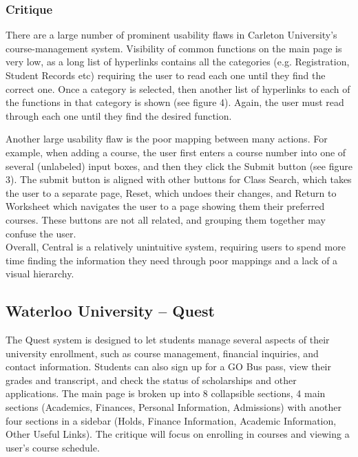 \documentclass[10pt]{article}
\newenvironment{InlineColumnFigure}
{\par\medskip\noindent\minipage{\linewidth}}
{\endminipage\par\medskip}
\newcommand{\Caption}[1]
{\vspace{-4mm}\fontsize{9}{9}\textbf{Figure \refstepcounter{figCounter} 
\arabic{figCounter}: #1}}
\newcounter{figCounter}
\begin{document}
\begin{multicols}{2}
\subsubsection*{Critique}
There are a large number of prominent usability flaws in Carleton University's 
course-management system. Visibility of common functions on the main 
page is very low, as a long list of hyperlinks contains all the categories (e.g. 
Registration, Student Records etc) requiring the user to read each one until 
they find the correct one. Once a category is selected, then another list of 
hyperlinks to each of the functions in that category is shown (see figure 4). 
Again, the user must read through each one until they find the desired function.



Another large usability flaw is the poor mapping between many actions. For 
example, when adding a course, the user first enters a course number into one of 
several (unlabeled) input boxes, and then they click the Submit button (see 
figure 3). The submit button is aligned with other buttons for Class Search, 
which takes the user to a separate page, Reset, which undoes their changes, and 
Return to Worksheet which navigates the user to a page showing them their 
preferred courses. These buttons are not all related, and grouping them together 
may confuse the user.\\

Overall, Central is a relatively unintuitive system, requiring users to spend 
more time finding the information they need through poor mappings and a lack of 
a visual hierarchy.

\subsection*{Waterloo University -- Quest}
The Quest system is designed to let students manage several aspects 
of their university enrollment, such as course management, financial inquiries, 
and contact information. Students can also sign up for a GO Bus pass, view their 
grades and transcript, and check the status of scholarships and other 
applications. The main page is broken up into 8 collapsible sections, 4 main 
sections (Academics, Finances, Personal Information, Admissions) with another four 
sections in a sidebar (Holds, Finance Information, Academic Information, Other 
Useful Links). The critique will focus on enrolling in courses and viewing a 
user's course schedule. 


\end{multicols}
\end{document}
